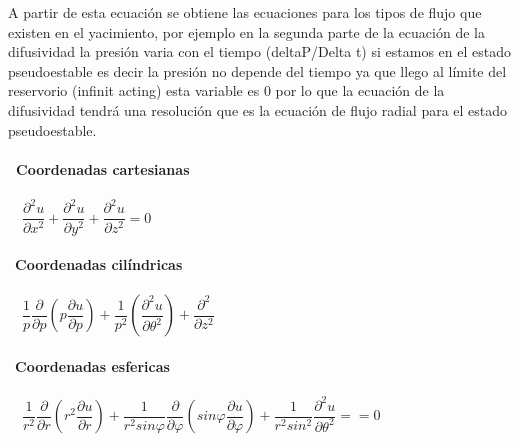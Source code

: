 \documentclass[10pt,a4paper]{report}
\begin{document}
A partir de esta ecuación se obtiene las ecuaciones para los tipos de flujo que existen en el yacimiento, por ejemplo en la segunda parte de la ecuación de la difusividad la presión varia con el tiempo (deltaP/Delta t) si estamos en el estado pseudoestable es decir la presión no depende del tiempo ya que llego al límite del reservorio (infinit acting) esta variable es 0 por lo que la ecuación de la difusividad tendrá una resolución que es la ecuación de flujo radial para el estado pseudoestable.
\medskip
\\
\\
\textbf{\ Coordenadas cartesianas}
\\
\\\
\ $ \dfrac{\partial^{2}u}{\partial x^{2}} + \dfrac{\partial^{2}u}{\partial y^{2}} + \dfrac{\partial^{2}u}{\partial z^{2}}= 0$
\\
\\\
\textbf{Coordenadas cilíndricas}
\\
\\\
\ $\dfrac{1}{p} \dfrac{\partial}{\partial p} \left( p \dfrac{\partial u}{\partial p} \right) + \dfrac{1}{p^{2}}  \left( \dfrac{\partial^{2} u}{\partial \theta^{2}} \right) + \dfrac{\partial^{2}}{\partial z^{2}}$
\\
\\\
\textbf{Coordenadas esfericas}
\\
\\\
\ $\dfrac{1}{r^{2}} \dfrac{\partial}{\partial r} \left( r^{2}  \dfrac{\partial u}{\partial r} \right) + \dfrac{1}{r^{2} sin \varphi }  \dfrac{\partial}{\partial \varphi} \left( sin \varphi \dfrac{\partial u}{\partial \varphi} \right) + \dfrac{1}{r^{2} sin^{2} }\dfrac{\partial^{2}u}{\partial \theta^{2}}= =0$
\end{document}

